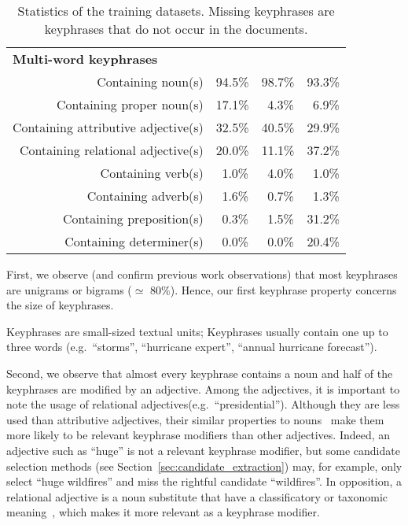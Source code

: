 \begin{table}
\begin{tabular}{lr|ccc}
        \hline
        \multicolumn{2}{l|}{\textbf{Multi-word keyphrases}}\\
        \multicolumn{2}{r|}{Containing noun(s)} & 94.5\% & 98.7\% & 93.3\%\\
        \multicolumn{2}{r|}{Containing proper noun(s)} & 17.1\% & $~~$4.3\% & $~~$6.9\%\\
        \multicolumn{2}{r|}{Containing attributive adjective(s)} & 32.5\% & 40.5\% & 29.9\%\\
        \multicolumn{2}{r|}{Containing relational adjective(s)} & 20.0\% & 11.1\% & 37.2\%\\
        \multicolumn{2}{r|}{Containing verb(s)} & $~~$1.0\% & $~~$4.0\% & $~~$1.0\%\\
        \multicolumn{2}{r|}{Containing adverb(s)} & $~~$1.6\% & $~~$0.7\% & $~~$1.3\%\\
        \multicolumn{2}{r|}{Containing preposition(s)} & $~~$0.3\% & $~~$1.5\% & 31.2\%\\
        \multicolumn{2}{r|}{Containing determiner(s)} & $~~$0.0\% & $~~$0.0\% & 20.4\%\\
        \bottomrule
      \end{tabular}
      \caption{Statistics of the training datasets. Missing keyphrases are
               keyphrases that do not occur in the documents.
               \label{tab:train_dataset_statistics}}
    \end{table}

    First, we observe (and confirm previous work observations) that most
    keyphrases are unigrams or bigrams ($\simeq$ 80\%). Hence, our first
    keyphrase property concerns the size of keyphrases.
    
    \begin{property}\label{prop:informativity}
      Keyphrases are small-sized textual units; Keyphrases usually contain one
      up to three words (e.g.~``storms'', ``hurricane expert'', ``annual
      hurricane forecast'').
    \end{property}

    Second, we observe that almost every keyphrase contains a noun and half of
    the keyphrases are modified by an adjective. Among the adjectives, it is
    important to note the usage of relational adjectives(e.g.~``presidential'').
    Although they are less used than attributive adjectives, their similar
    properties to
    nouns~\cite{bally1944linguistiquegeneraleetlinguistiquefrancaise} make them
    more likely to be relevant keyphrase modifiers than other adjectives.
    Indeed, an adjective such as ``huge'' is not a relevant keyphrase modifier,
    but some candidate selection methods (see
    Section~\ref{sec:candidate_extraction}) may, for example, only select ``huge
    wildfires'' and miss the rightful candidate ``wildfires''. In opposition, a
    relational adjective is a noun substitute that have a classificatory or
    taxonomic meaning~\cite{mcnally2004relationaladjectives}, which makes it
    more relevant as a keyphrase modifier.

